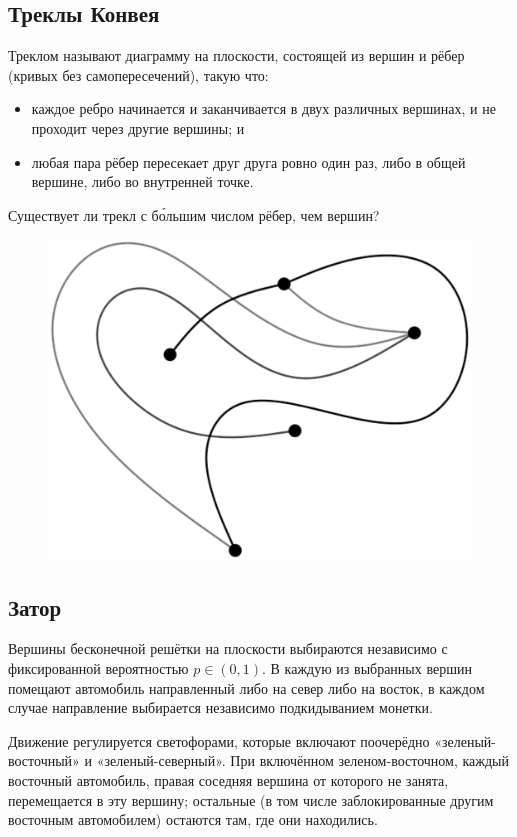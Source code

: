 \subsection*{Треклы Конвея}

Треклом называют диаграмму на плоскости, состоящей из вершин и рёбер (кривых без самопересечений), такую что:
\begin{itemize}
\item каждое ребро начинается и заканчивается в двух различных вершинах, и не проходит через другие вершины; и
\item любая пара рёбер пересекает друг друга ровно один раз, либо в общей вершине, либо во внутренней точке.
\end{itemize}

Существует ли трекл с б\'{о}льшим числом рёбер, чем вершин?

\begin{figure}[h!]
\centering
\includegraphics[scale=0.5]{Figs/UnsolvedPuzzles/thrack}
\end{figure}

\subsection*{Затор}

Вершины бесконечной решётки на плоскости выбираются независимо с фиксированной вероятностью $p\in (0,1)$.
В каждую из выбранных вершин помещают автомобиль направленный либо на север либо на восток,
в каждом  случае направление выбирается независимо подкидыванием монетки.

Движение регулируется светофорами, которые включают поочерёдно «зеленый-восточный» и «зеленый-северный».
При включённом зеленом-восточном, каждый восточный автомобиль, правая соседняя вершина от которого не занята, перемещается в эту вершину; остальные (в том числе заблокированные другим восточным автомобилем) остаются там, где они находились.

